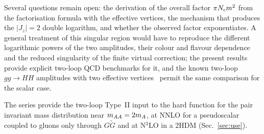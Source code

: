 Several questions remain open: the derivation of the overall factor
$\pi N_c m^2$ from the factorisation formula with the effective vertices,
the mechanism that produces the $|J_z|=2$ double logarithm, and whether the
observed factor exponentiates. A general treatment of this singular region
would have to reproduce the different logarithmic powers of the two
amplitudes, their colour and flavour dependence and the reduced singularity
of the finite virtual correction; the present results provide explicit
two-loop QCD benchmarks for it, and the known two-loop $gg\to HH$
amplitudes with two effective vertices~\cite{Banerjee:2018lfq} permit the
same comparison for the scalar case.

The series provide the two-loop Type~II input to the hard function for the
pair invariant mass distribution near $m_{AA}=2m_A$, at NNLO for a
pseudoscalar coupled to gluons only through $G\tilde G$ and at N$^3$LO in a
2HDM (Sec.~\ref{sec:use}).
